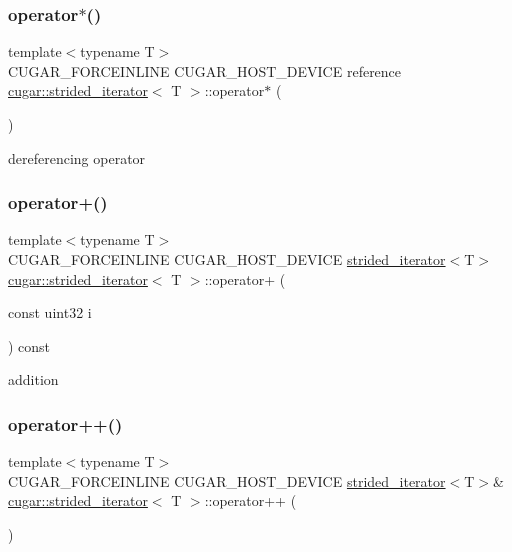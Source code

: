 \subsubsection{\texorpdfstring{operator$\ast$()}{operator*()}\hspace{0.1cm}{\footnotesize\ttfamily [2/2]}}
{\footnotesize\ttfamily template$<$typename T$>$ \\
C\+U\+G\+A\+R\+\_\+\+F\+O\+R\+C\+E\+I\+N\+L\+I\+NE C\+U\+G\+A\+R\+\_\+\+H\+O\+S\+T\+\_\+\+D\+E\+V\+I\+CE reference \hyperlink{structcugar_1_1strided__iterator}{cugar\+::strided\+\_\+iterator}$<$ T $>$\+::operator$\ast$ (\begin{DoxyParamCaption}{ }\end{DoxyParamCaption})\hspace{0.3cm}{\ttfamily [inline]}}

dereferencing operator \mbox{\label{structcugar_1_1strided__iterator_ae8d69a6cd4d09d11d0f5f94e2da74890}} 
\subsubsection{\texorpdfstring{operator+()}{operator+()}}
{\footnotesize\ttfamily template$<$typename T$>$ \\
C\+U\+G\+A\+R\+\_\+\+F\+O\+R\+C\+E\+I\+N\+L\+I\+NE C\+U\+G\+A\+R\+\_\+\+H\+O\+S\+T\+\_\+\+D\+E\+V\+I\+CE \hyperlink{structcugar_1_1strided__iterator}{strided\+\_\+iterator}$<$T$>$ \hyperlink{structcugar_1_1strided__iterator}{cugar\+::strided\+\_\+iterator}$<$ T $>$\+::operator+ (\begin{DoxyParamCaption}\item[{const uint32}]{i }\end{DoxyParamCaption}) const\hspace{0.3cm}{\ttfamily [inline]}}

addition \mbox{\label{structcugar_1_1strided__iterator_acd0748fb742a987def5bb74952c769d7}} 
\subsubsection{\texorpdfstring{operator++()}{operator++()}}
{\footnotesize\ttfamily template$<$typename T$>$ \\
C\+U\+G\+A\+R\+\_\+\+F\+O\+R\+C\+E\+I\+N\+L\+I\+NE C\+U\+G\+A\+R\+\_\+\+H\+O\+S\+T\+\_\+\+D\+E\+V\+I\+CE \hyperlink{structcugar_1_1strided__iterator}{strided\+\_\+iterator}$<$T$>$\& \hyperlink{structcugar_1_1strided__iterator}{cugar\+::strided\+\_\+iterator}$<$ T $>$\+::operator++ (\begin{DoxyParamCaption}{ }\end{DoxyParamCaption})\hspace{0.3cm}{\ttfamily [inline]}}

